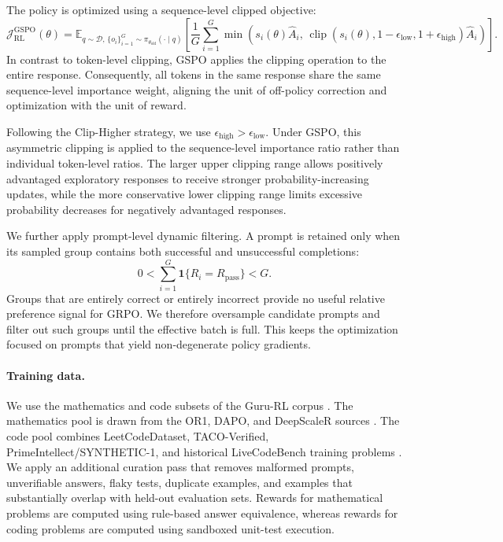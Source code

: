 The policy is optimized using a sequence-level clipped objective:
%
\begin{equation*}
\mathcal{J}_{\mathrm{RL}}^{\mathrm{GSPO}}(\theta)
=
\mathbb{E}_{
    q \sim \mathcal{D},\,
    \{o_i\}_{i=1}^{G}
    \sim \pi_{\theta_{\mathrm{old}}}(\cdot \mid q)
}
\left[
    \frac{1}{G}
    \sum_{i=1}^{G}
    \min
    \left(
        s_i(\theta)\hat{A}_i,\,
        \operatorname{clip}
        \left(
            s_i(\theta),
            1-\epsilon_{\mathrm{low}},
            1+\epsilon_{\mathrm{high}}
        \right)
        \hat{A}_i
    \right)
\right].
\label{eq:gspo-objective}
\end{equation*}
%
In contrast to token-level clipping, GSPO applies the clipping operation
to the entire response. Consequently, all tokens in the same response
share the same sequence-level importance weight, aligning the unit of
off-policy correction and optimization with the unit of reward.

Following the Clip-Higher strategy, we use
$\epsilon_{\mathrm{high}} > \epsilon_{\mathrm{low}}$.
Under GSPO, this asymmetric clipping is applied to the sequence-level importance ratio rather than individual token-level ratios. The larger upper clipping range allows positively advantaged exploratory responses
to receive stronger probability-increasing updates, while the more
conservative lower clipping range limits excessive probability decreases
for negatively advantaged responses.

We further apply prompt-level dynamic filtering. A prompt is retained only
when its sampled group contains both successful and unsuccessful completions:
%
\begin{equation*}
0
<
\sum_{i=1}^{G}
\mathbf{1}\{R_i = R_{\mathrm{pass}}\}
<
G.
\label{eq:dynamic-filtering}
\end{equation*}
%
Groups that are entirely correct or entirely incorrect provide no useful
relative preference signal for GRPO. We therefore oversample candidate
prompts and filter out such groups until the effective batch is full. This
keeps the optimization focused on prompts that yield non-degenerate policy
gradients.

\paragraph{Training data.}
We use the mathematics and code subsets of the Guru-RL corpus
\citep{cheng2025guru}. The mathematics pool is drawn from the OR1, DAPO, and
DeepScaleR sources \citep{he2025skywork,yu2025dapo,tan2025deepscaler}. The
code pool combines LeetCodeDataset, TACO-Verified, PrimeIntellect/SYNTHETIC-1,
and historical LiveCodeBench training problems
\citep{xia2025leetcodedataset,li2023taco,li2024tacoverified,
mattern2025synthetic1,jain2024livecodebench}. We apply an additional
curation pass that removes malformed prompts, unverifiable answers, flaky
tests, duplicate examples, and examples that substantially overlap with
held-out evaluation sets. Rewards for mathematical problems are computed using
rule-based answer equivalence, whereas rewards for coding problems are computed
using sandboxed unit-test execution.

